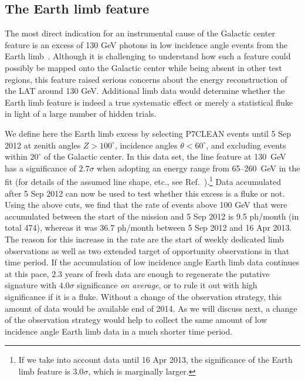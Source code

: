 \documentclass[aps,prd,superscriptaddress,nofootinbib,fixlfloat, 12pt]{revtex4-1}
\begin{document}
\subsection{The Earth limb feature}
The most direct indication for an instrumental cause of the Galactic center
feature is an excess of 130 GeV photons in low incidence angle events from
the Earth limb~\cite{linepaper, finkbeiner_systematics, Hektor:2012ev,
bloom_charles_fermi_lat_line}. Although it is challenging to understand how
such a feature could possibly be mapped onto the Galactic center while being
absent in other test regions, this feature raised serious concerns about the
energy reconstruction of the LAT around 130 GeV.  Additional limb data would
determine whether the Earth limb feature is indeed a true systematic effect or
merely a statistical fluke in light of a large number of hidden trials.

We define here the Earth limb excess by selecting P7CLEAN events until 5 Sep
2012 at zenith angles $Z>100^\circ$,
incidence angles $\theta<60^\circ$, and excluding events within $20^\circ$ of
the Galactic center. In this data set, the line feature at 130~GeV has a
significance of $2.7\sigma$ when
adopting an energy range from 65--260~GeV in the fit (for details of the
assumed line shape, etc.,
see Ref.~\cite{finkbeiner_systematics}).\footnote{If we take into account data
  until 16 Apr 2013, the
significance of the Earth limb feature is $3.0\sigma$, which is marginally
larger.}
Data accumulated after 5 Sep 2012 can
now be used to test whether this excess is a fluke or not. Using the above
cuts, we find that the rate of events above 100 GeV that were accumulated between the
start of the mission and 5 Sep 2012 is 9.5 ph/month (in total 474), whereas it
was 36.7 ph/month between 5 Sep 2012 and 16 Apr 2013. The reason for this increase
in the rate are the start of weekly dedicated limb observations as well as two extended
target of opportunity observations in that time period. If the accumulation of
low incidence angle Earth limb data continues at this pace, 2.3 years of fresh
data are enough to regenerate the putative signature with $4.0\sigma$
significance \emph{on average}, or to rule it out with high significance if it is a
fluke. Without a change of the observation strategy, this amount of data would
be available end of 2014. As we will discuss next, a change of the
observation strategy would help to collect the same amount of low incidence
angle Earth limb data in a much shorter time period.
\end{document}
